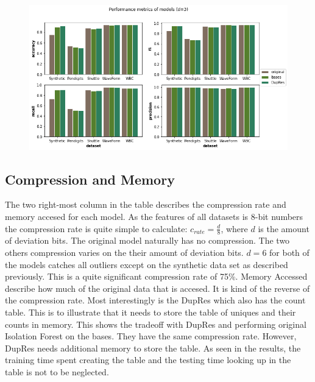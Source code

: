 \begin{figure}
  \centering
  \includegraphics[width=\linewidth]{images/performance_metrics.png}
  \caption{}
  \label{fig:performance_metrics}
\end{figure}
\subsection{Compression and Memory}
The two right-most column in the table describes the compression rate and memory accesed for each model. As the features of all datasets is 8-bit numbers the compression rate is quite simple to calculate: $c_{rate}=\frac{d}{8}$, where $d$ is the amount of deviation bits. The original model naturally has no compression. The two others compression varies on the their amount of deviation bits. $d=6$ for both of the models catches all outliers except on the synthetic data set as described previously. This is a quite significant compression rate of 75\%. Memory Accessed describe how much of the original data that is accesed. It is kind of the reverse of the compression rate. Most interestingly is the DupRes which also has the count table. This is to illustrate that it needs to store the table of uniques and their counts in memory. This shows the tradeoff with DupRes and performing original Isolation Forest on the bases. They have the same compression rate. However, DupRes needs additional memory to store the table. As seen in the results, the training time spent creating the table and the testing time looking up in the table is not to be neglected.       

